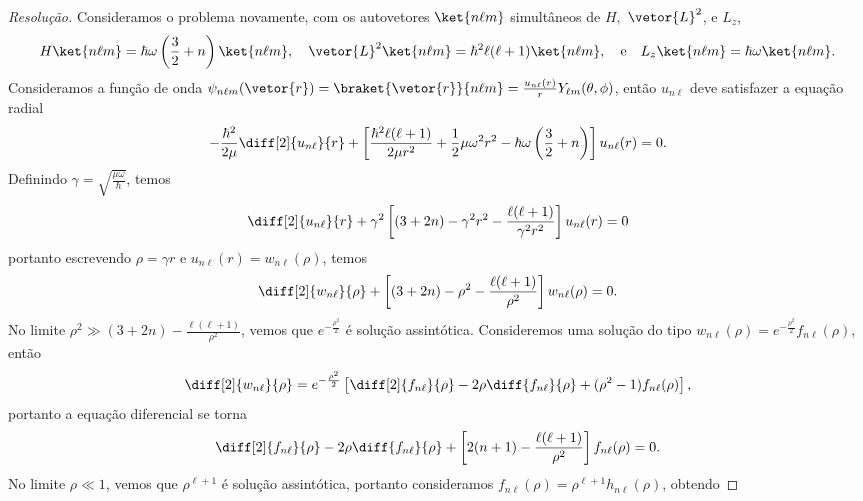 \begin{proof}[Resolução]
    Consideramos o problema novamente, com os autovetores \(\ket{n \ell m}\) simultâneos de \(H,\) \(\vetor{L}^2\), e \(L_z\),
    \begin{equation*}
        H\ket{n \ell m} = \hbar \omega \left(\frac32 + n\right) \ket{n \ell m},\quad
        \vetor{L}^2\ket{n \ell m} = \hbar^2 \ell(\ell + 1) \ket{n \ell m},\quad\text{e}\quad
        L_z\ket{n \ell m} = \hbar \omega \ket{n \ell m}.
    \end{equation*} 
    Consideramos a função de onda \(\psi_{n\ell m}(\vetor{r}) = \braket{\vetor{r}}{n \ell m} = \frac{u_{n\ell}(r)}{r} Y_{\ell m}(\theta, \phi)\), então \(u_{n\ell}\) deve satisfazer a equação radial
    \begin{equation*}
        -\frac{\hbar^2}{2\mu}\diff[2]{u_{n\ell}}{r} + \left[\frac{\hbar^2\ell(\ell + 1)}{2\mu r^2} + \frac12 \mu \omega^2 r^2 - \hbar\omega \left(\frac{3}{2} + n\right)\right]u_{n \ell}(r) = 0.
    \end{equation*}
    Definindo \(\gamma = \sqrt{\frac{\mu \omega}{\hbar}}\), temos
    \begin{equation*}
        \diff[2]{u_{n\ell}}{r} + \gamma^2\left[(3 + 2n) - \gamma^2r^2 - \frac{\ell(\ell + 1)}{\gamma^2r^2}\right]u_{n \ell}(r) = 0
    \end{equation*}
    portanto escrevendo \(\rho = \gamma r\) e \(u_{n\ell}(r) = w_{n \ell}(\rho)\), temos
    \begin{equation*}
        \diff[2]{w_{n\ell}}{\rho} + \left[(3 + 2n)- \rho^2 - \frac{\ell(\ell + 1)}{\rho^2}\right]w_{n \ell}(\rho) = 0.
    \end{equation*}
    No limite \(\rho^2 \gg (3+2n) - \frac{\ell(\ell+1)}{\rho^2}\), vemos que \(e^{-\frac{\rho^2}{2}}\) é solução assintótica. Consideremos uma solução do tipo \(w_{n\ell}(\rho) = e^{-\frac{\rho^2}{2}}f_{n \ell}(\rho)\), então
    \begin{equation*}
        \diff[2]{w_{n\ell}}{\rho} = e^{-\frac{\rho^2}{2}} \left[\diff[2]{f_{n\ell}}{\rho} - 2\rho \diff{f_{n\ell}}{\rho} + (\rho^2 - 1)f_{n\ell}(\rho)\right],
    \end{equation*}
    portanto a equação diferencial se torna
    \begin{equation*}
        \diff[2]{f_{n\ell}}{\rho} - 2\rho \diff{f_{n\ell}}{\rho} + \left[2(n+1) - \frac{\ell (\ell + 1)}{\rho^2}\right]f_{n\ell}(\rho) = 0.
    \end{equation*}
    No limite \(\rho \ll 1\), vemos que \(\rho^{\ell + 1}\) é solução assintótica, portanto consideramos \(f_{n\ell}(\rho) = \rho^{\ell+1} h_{n\ell}(\rho)\), obtendo

\end{proof}
